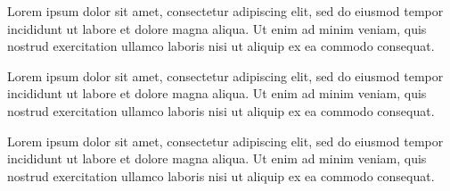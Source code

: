 \documentclass{article}
\begin{document}
Lorem ipsum dolor sit amet, consectetur adipiscing elit, sed do eiusmod tempor incididunt ut labore et dolore magna aliqua. Ut enim ad minim veniam, quis nostrud exercitation ullamco laboris nisi ut aliquip ex ea commodo consequat.

Lorem ipsum dolor sit amet, consectetur adipiscing elit, sed do eiusmod tempor incididunt ut labore et dolore magna aliqua. Ut enim ad minim veniam, quis nostrud exercitation ullamco laboris nisi ut aliquip ex ea commodo consequat.

Lorem ipsum dolor sit amet, consectetur adipiscing elit, sed do eiusmod tempor incididunt ut labore et dolore magna aliqua. Ut enim ad minim veniam, quis nostrud exercitation ullamco laboris nisi ut aliquip ex ea commodo consequat.
\end{document}
